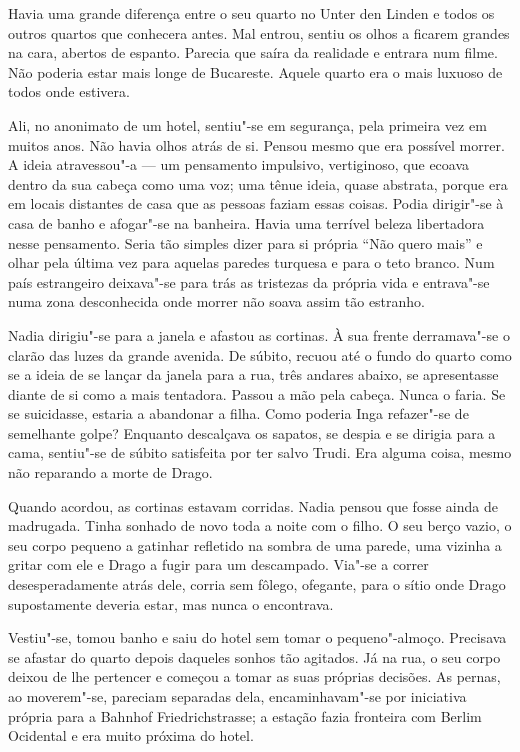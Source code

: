 Havia uma grande diferença entre o seu quarto no Unter den Linden e
todos os outros quartos que conhecera antes. Mal entrou, sentiu os olhos
a ficarem grandes na cara, abertos de espanto. Parecia que saíra da
realidade e entrara num filme. Não poderia estar mais longe de Bucareste. Aquele quarto era o mais luxuoso de todos onde estivera.

Ali, no anonimato de um hotel, sentiu"-se em segurança, pela primeira vez
em muitos anos. Não havia olhos atrás de si. Pensou mesmo que era
possível morrer. A ideia atravessou"-a --- um pensamento impulsivo,
vertiginoso, que ecoava dentro da sua cabeça como uma voz; uma tênue
ideia, quase abstrata, porque era em locais distantes de casa que as
pessoas faziam essas coisas. Podia dirigir"-se à casa de banho e
afogar"-se na banheira. Havia uma terrível beleza libertadora nesse
pensamento. Seria tão simples dizer para si própria ``Não quero mais'' e
olhar pela última vez para aquelas paredes turquesa e para o teto
branco. Num país estrangeiro deixava"-se para trás as tristezas da
própria vida e entrava"-se numa zona desconhecida onde morrer não soava
assim tão estranho.

Nadia dirigiu"-se para a janela e afastou as cortinas. À sua frente
derramava"-se o clarão das luzes da grande avenida. De súbito, recuou até
o fundo do quarto como se a ideia de se lançar da janela para a rua,
três andares abaixo, se apresentasse diante de si como a mais tentadora.
Passou a mão pela cabeça. Nunca o faria. Se se suicidasse, estaria a
abandonar a filha. Como poderia Inga refazer"-se de semelhante golpe?
Enquanto descalçava os sapatos, se despia e se dirigia para a cama,
sentiu"-se de súbito satisfeita por ter salvo Trudi. Era alguma coisa,
mesmo não reparando a morte de Drago.

Quando acordou, as cortinas estavam corridas. Nadia pensou que fosse
ainda de madrugada. Tinha sonhado de novo toda a noite com o filho. O
seu berço vazio, o seu corpo pequeno a gatinhar refletido na sombra de
uma parede, uma vizinha a gritar com ele e Drago a fugir para um
descampado. Via"-se a correr desesperadamente atrás dele, corria sem
fôlego, ofegante, para o sítio onde Drago supostamente deveria estar,
mas nunca o encontrava.

Vestiu"-se, tomou banho e saiu do hotel sem tomar o pequeno"-almoço.
Precisava se afastar do quarto depois daqueles sonhos tão agitados.
Já na rua, o seu corpo deixou de lhe pertencer e começou a tomar as
suas próprias decisões. As pernas, ao moverem"-se, pareciam separadas
dela, encaminhavam"-se por iniciativa própria para a Bahnhof
Friedrichstrasse; a estação fazia fronteira com Berlim Ocidental e era
muito próxima do hotel.

